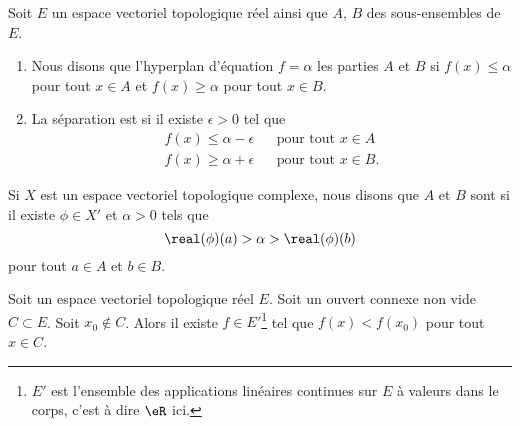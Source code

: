 \begin{definition}		\label{DEFooQUDEooMrgcCV}
	Soit \( E\) un espace vectoriel topologique réel ainsi que \( A\), \( B\) des sous-ensembles de \( E\).
	\begin{enumerate}
		\item
		      Nous disons que l'hyperplan d'équation \( f=\alpha\)  les parties \( A\) et \( B\) si \( f(x)\leq \alpha\) pour tout \( x\in A\) et \( f(x)\geq \alpha\) pour tout \( x\in B\).
		\item
		      La séparation est  si il existe \( \epsilon>0\) tel que
		      \begin{subequations}
			      \begin{align}
				      f(x)\leq \alpha-\epsilon &  & \text{pour tout } x\in A  \\
				      f(x)\geq \alpha+\epsilon &  & \text{pour tout } x\in B.
			      \end{align}
		      \end{subequations}
	\end{enumerate}

	Si \( X\) est un espace vectoriel topologique complexe, nous disons que \( A\) et \( B\) sont  si il existe \( \phi\in X'\) et \( \alpha>0\) tels que
	\begin{equation}
		\real (\phi)(a)>\alpha>\real(\phi)(b)
	\end{equation}
	pour tout \( a\in A\) et \( b\in B\).
\end{definition}


\begin{proposition}	\label{PROPooSKBXooQDOmcL}
	Soit un espace vectoriel topologique réel \( E\). Soit un ouvert connexe non vide \( C\subset E\). Soit \( x_0\not\in C\). Alors il existe \( f\in E'\)\footnote{\( E'\) est l'ensemble des applications linéaires continues sur \( E\) à valeurs dans le corps, c'est à dire \( \eR\) ici.} tel que \( f(x)<f(x_0)\) pour tout \( x\in C\).
\end{proposition}

